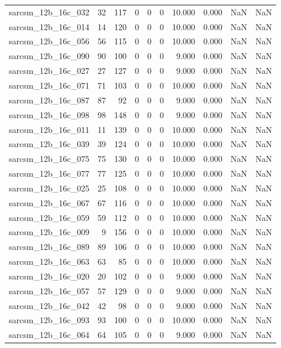 \documentclass{article}
\begin{document}
\begin{longtable}{lrrrrrrrrr}
sarcsm\_12b\_16c\_032 & 32 & 117 & 0 & 0 & 0 & 10.000 & 0.000 & NaN & NaN \\
sarcsm\_12b\_16c\_014 & 14 & 120 & 0 & 0 & 0 & 10.000 & 0.000 & NaN & NaN \\
sarcsm\_12b\_16c\_056 & 56 & 115 & 0 & 0 & 0 & 10.000 & 0.000 & NaN & NaN \\
sarcsm\_12b\_16c\_090 & 90 & 100 & 0 & 0 & 0 & 9.000 & 0.000 & NaN & NaN \\
sarcsm\_12b\_16c\_027 & 27 & 127 & 0 & 0 & 0 & 9.000 & 0.000 & NaN & NaN \\
sarcsm\_12b\_16c\_071 & 71 & 103 & 0 & 0 & 0 & 10.000 & 0.000 & NaN & NaN \\
sarcsm\_12b\_16c\_087 & 87 & 92 & 0 & 0 & 0 & 9.000 & 0.000 & NaN & NaN \\
sarcsm\_12b\_16c\_098 & 98 & 148 & 0 & 0 & 0 & 9.000 & 0.000 & NaN & NaN \\
sarcsm\_12b\_16c\_011 & 11 & 139 & 0 & 0 & 0 & 10.000 & 0.000 & NaN & NaN \\
sarcsm\_12b\_16c\_039 & 39 & 124 & 0 & 0 & 0 & 10.000 & 0.000 & NaN & NaN \\
sarcsm\_12b\_16c\_075 & 75 & 130 & 0 & 0 & 0 & 10.000 & 0.000 & NaN & NaN \\
sarcsm\_12b\_16c\_077 & 77 & 125 & 0 & 0 & 0 & 10.000 & 0.000 & NaN & NaN \\
sarcsm\_12b\_16c\_025 & 25 & 108 & 0 & 0 & 0 & 10.000 & 0.000 & NaN & NaN \\
sarcsm\_12b\_16c\_067 & 67 & 116 & 0 & 0 & 0 & 10.000 & 0.000 & NaN & NaN \\
sarcsm\_12b\_16c\_059 & 59 & 112 & 0 & 0 & 0 & 10.000 & 0.000 & NaN & NaN \\
sarcsm\_12b\_16c\_009 & 9 & 156 & 0 & 0 & 0 & 10.000 & 0.000 & NaN & NaN \\
sarcsm\_12b\_16c\_089 & 89 & 106 & 0 & 0 & 0 & 10.000 & 0.000 & NaN & NaN \\
sarcsm\_12b\_16c\_063 & 63 & 85 & 0 & 0 & 0 & 10.000 & 0.000 & NaN & NaN \\
sarcsm\_12b\_16c\_020 & 20 & 102 & 0 & 0 & 0 & 9.000 & 0.000 & NaN & NaN \\
sarcsm\_12b\_16c\_057 & 57 & 129 & 0 & 0 & 0 & 9.000 & 0.000 & NaN & NaN \\
sarcsm\_12b\_16c\_042 & 42 & 98 & 0 & 0 & 0 & 9.000 & 0.000 & NaN & NaN \\
sarcsm\_12b\_16c\_093 & 93 & 100 & 0 & 0 & 0 & 10.000 & 0.000 & NaN & NaN \\
sarcsm\_12b\_16c\_064 & 64 & 105 & 0 & 0 & 0 & 9.000 & 0.000 & NaN & NaN \\

\end{longtable}
\end{document}
